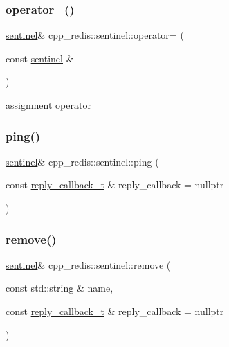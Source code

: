 \mbox{\label{classcpp__redis_1_1sentinel_a06b8d049160e3990cdac3158aaf160a6}} 
\subsubsection{\texorpdfstring{operator=()}{operator=()}}
{\footnotesize\ttfamily \hyperlink{classcpp__redis_1_1sentinel}{sentinel}\& cpp\+\_\+redis\+::sentinel\+::operator= (\begin{DoxyParamCaption}\item[{const \hyperlink{classcpp__redis_1_1sentinel}{sentinel} \&}]{ }\end{DoxyParamCaption})\hspace{0.3cm}{\ttfamily [delete]}}



assignment operator 

\mbox{\label{classcpp__redis_1_1sentinel_aba0190b2773d4d1f8d5e4c5aac22ce19}} 
\subsubsection{\texorpdfstring{ping()}{ping()}}
{\footnotesize\ttfamily \hyperlink{classcpp__redis_1_1sentinel}{sentinel}\& cpp\+\_\+redis\+::sentinel\+::ping (\begin{DoxyParamCaption}\item[{const \hyperlink{classcpp__redis_1_1sentinel_ae1a150ff8787208c47414397a061c9a7}{reply\+\_\+callback\+\_\+t} \&}]{reply\+\_\+callback = {\ttfamily nullptr} }\end{DoxyParamCaption})}

\mbox{\label{classcpp__redis_1_1sentinel_aee344f7f63bc02d13cb9dce08d48d5d9}} 
\subsubsection{\texorpdfstring{remove()}{remove()}}
{\footnotesize\ttfamily \hyperlink{classcpp__redis_1_1sentinel}{sentinel}\& cpp\+\_\+redis\+::sentinel\+::remove (\begin{DoxyParamCaption}\item[{const std\+::string \&}]{name,  }\item[{const \hyperlink{classcpp__redis_1_1sentinel_ae1a150ff8787208c47414397a061c9a7}{reply\+\_\+callback\+\_\+t} \&}]{reply\+\_\+callback = {\ttfamily nullptr} }\end{DoxyParamCaption})}

